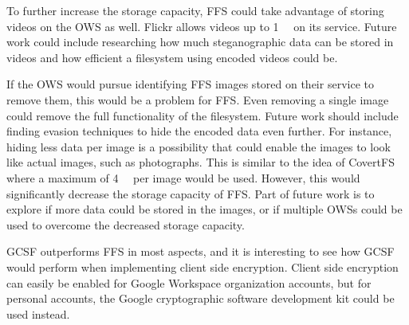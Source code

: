 To further increase the storage capacity, \gls{FFS} could take advantage of storing videos on the \gls{OWS} as well. Flickr allows videos up to \SI[per-mode = symbol]{1}{\giga\byte} on its service. Future work could include researching how much steganographic data can be stored in videos and how efficient a filesystem using encoded videos could be.

If the \gls{OWS} would pursue identifying \gls{FFS} images stored on their service to remove them, this would be a problem for \gls{FFS}. Even removing a single image could remove the full functionality of the filesystem. Future work should include finding evasion techniques to hide the encoded data even further. For instance, hiding less data per image is a possibility that could enable the images to look like actual images, such as photographs. This is similar to the idea of CovertFS\,\cite{baliga2007web} where a maximum of \SI[per-mode = symbol]{4}{\kilo\byte} per image would be used. However, this would significantly decrease the storage capacity of \gls{FFS}. Part of future work is to explore if more data could be stored in the images, or if multiple \glspl{OWS} could be used to overcome the decreased storage capacity. 

\gls{GCSF} outperforms \gls{FFS} in most aspects, and it is interesting to see how \gls{GCSF} would perform when implementing client side encryption. Client side encryption can easily be enabled for Google Workspace organization accounts, but for personal accounts, the Google cryptographic software development kit could be used instead.

%
%